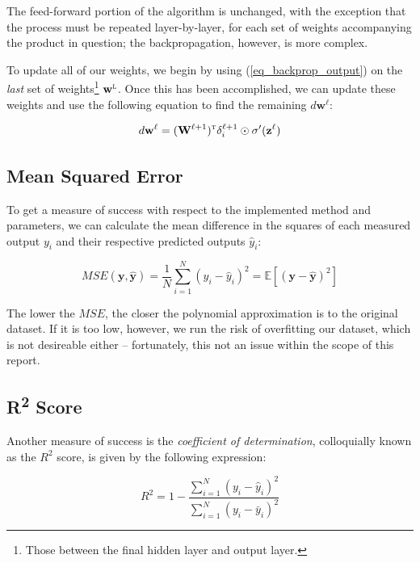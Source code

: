 \documentclass[a4paper,10pt,english]{article}
\begin{document}
\begin{multicols*}{2}
The feed-forward portion of the algorithm is unchanged, with the exception that the process must be repeated layer-by-layer, for each set of weights accompanying the product in question; the backpropagation, however, is more complex.

To update all of our weights, we begin by using (\ref{eq_backprop_output}) on the \textit{last} set of weights\footnote{Those between the final hidden layer and output layer.} $\mathbf{w}^\textsc{l}$.  Once this has been accomplished, we can update these weights and use the following equation to find the remaining $d\mathbf{w}^\ell$:

\begin{equation*}
d\mathbf{w}^\ell = (\mathbf{W}^{\ell+1})^\textsc{t} \delta^{\ell+1}_i \odot \sigma^\prime(\mathbf{z}^\ell)
\end{equation*}

\subsection*{Mean Squared Error}

To get a measure of success with respect to the implemented method and parameters, we can calculate the mean difference in the squares of each measured output $y_i$ and their respective predicted outputs $\hat{y}_i$:

\begin{equation*}
MSE(\mathbf{y}, \mathbf{\hat{y}}) = \frac{1}{N} \sum_{i=1}^{N} (y_i - \hat{y}_i)^2 = \mathbb{E}\left[(\mathbf{y}-\hat{\mathbf{y}})^{2}\right]
\end{equation*}

The lower the $MSE$, the closer the polynomial approximation is to the original dataset.  If it is too low, however, we run the risk of overfitting our dataset, which is not desireable either – fortunately, this not an issue within the scope of this report.

\subsection*{R\textsuperscript{2} Score}

Another measure of success is the \textit{coefficient of determination}, colloquially known as the $R^2$ score, is given by the following expression:

\begin{equation*}
R^2 = 1 - \frac{\sum_{i=1}^N (y_i - \hat{y}_i)^2 }{\sum_{i=1}^N (y_i - \bar{y}_i)^2 }
\end{equation*}


\end{multicols*}
\end{document}
